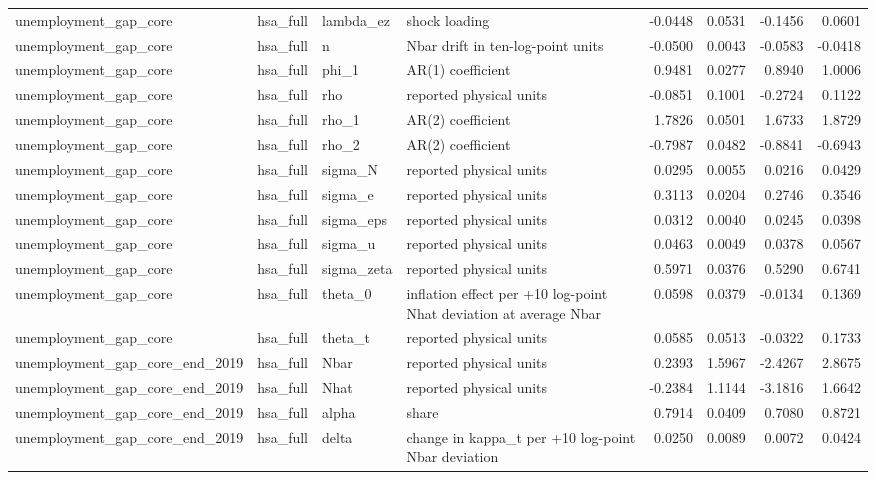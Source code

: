 \begin{tabular}{llllrrrr}
unemployment\_gap\_core & hsa\_full & lambda\_ez & shock loading & -0.0448 & 0.0531 & -0.1456 & 0.0601 \\
unemployment\_gap\_core & hsa\_full & n & Nbar drift in ten-log-point units & -0.0500 & 0.0043 & -0.0583 & -0.0418 \\
unemployment\_gap\_core & hsa\_full & phi\_1 & AR(1) coefficient & 0.9481 & 0.0277 & 0.8940 & 1.0006 \\
unemployment\_gap\_core & hsa\_full & rho & reported physical units & -0.0851 & 0.1001 & -0.2724 & 0.1122 \\
unemployment\_gap\_core & hsa\_full & rho\_1 & AR(2) coefficient & 1.7826 & 0.0501 & 1.6733 & 1.8729 \\
unemployment\_gap\_core & hsa\_full & rho\_2 & AR(2) coefficient & -0.7987 & 0.0482 & -0.8841 & -0.6943 \\
unemployment\_gap\_core & hsa\_full & sigma\_N & reported physical units & 0.0295 & 0.0055 & 0.0216 & 0.0429 \\
unemployment\_gap\_core & hsa\_full & sigma\_e & reported physical units & 0.3113 & 0.0204 & 0.2746 & 0.3546 \\
unemployment\_gap\_core & hsa\_full & sigma\_eps & reported physical units & 0.0312 & 0.0040 & 0.0245 & 0.0398 \\
unemployment\_gap\_core & hsa\_full & sigma\_u & reported physical units & 0.0463 & 0.0049 & 0.0378 & 0.0567 \\
unemployment\_gap\_core & hsa\_full & sigma\_zeta & reported physical units & 0.5971 & 0.0376 & 0.5290 & 0.6741 \\
unemployment\_gap\_core & hsa\_full & theta\_0 & inflation effect per +10 log-point Nhat deviation at average Nbar & 0.0598 & 0.0379 & -0.0134 & 0.1369 \\
unemployment\_gap\_core & hsa\_full & theta\_t & reported physical units & 0.0585 & 0.0513 & -0.0322 & 0.1733 \\
unemployment\_gap\_core\_end\_2019 & hsa\_full & Nbar & reported physical units & 0.2393 & 1.5967 & -2.4267 & 2.8675 \\
unemployment\_gap\_core\_end\_2019 & hsa\_full & Nhat & reported physical units & -0.2384 & 1.1144 & -3.1816 & 1.6642 \\
unemployment\_gap\_core\_end\_2019 & hsa\_full & alpha & share & 0.7914 & 0.0409 & 0.7080 & 0.8721 \\
unemployment\_gap\_core\_end\_2019 & hsa\_full & delta & change in kappa\_t per +10 log-point Nbar deviation & 0.0250 & 0.0089 & 0.0072 & 0.0424 \\

\end{tabular}
